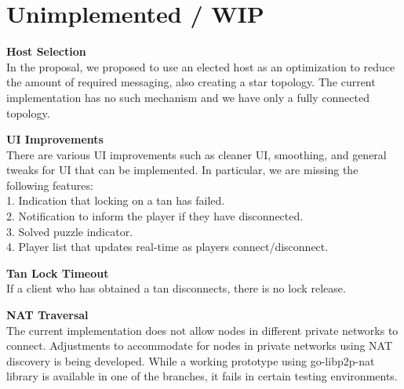 \documentclass[twocolumn]{article}
\begin{document}
\section{Unimplemented / WIP}
\noindent
\textbf{Host Selection}\\
In the proposal, we proposed to use an elected host as an optimization to reduce the amount of required messaging, also creating a star topology. The current implementation has no such mechanism and we have only a fully connected topology.

\noindent
\textbf{UI Improvements}\\
There are various UI improvements such as cleaner UI, smoothing, and general tweaks for UI that can be implemented. In particular, we are missing the following features:\\
\hspace*{1em}1. Indication that locking on a tan has failed.\\
\hspace*{1em}2. Notification to inform the player if they have disconnected.\\
\hspace*{1em}3. Solved puzzle indicator.\\
\hspace*{1em}4. Player list that updates real-time as players connect/disconnect.

\noindent
\textbf{Tan Lock Timeout}\\
If a client who has obtained a tan disconnects, there is no lock release.

\noindent
\textbf{NAT Traversal}\\
The current implementation does not allow nodes in different private networks to connect. Adjustments to accommodate for nodes in private networks using NAT discovery is being developed. While a working prototype using go-libp2p-nat library is available in one of the branches, it fails in certain testing environments.
\end{document}
